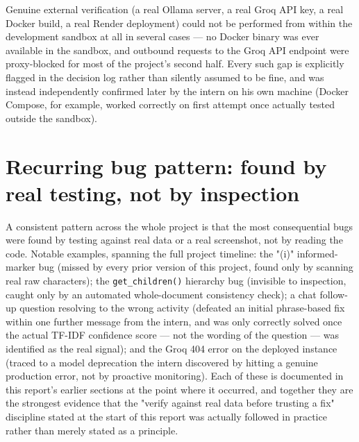 Genuine external verification (a real Ollama server, a real Groq API key, a real Docker build, a real Render deployment) could not be performed from within the development sandbox at all in several cases — no Docker binary was ever available in the sandbox, and outbound requests to the Groq API endpoint were proxy-blocked for most of the project's second half. Every such gap is explicitly flagged in the decision log rather than silently assumed to be fine, and was instead independently confirmed later by the intern on his own machine (Docker Compose, for example, worked correctly on first attempt once actually tested outside the sandbox).

\section{Recurring bug pattern: found by real testing, not by inspection}
A consistent pattern across the whole project is that the most consequential bugs were found by testing against real data or a real screenshot, not by reading the code. Notable examples, spanning the full project timeline: the "(i)" informed-marker bug (missed by every prior version of this project, found only by scanning real raw characters); the \texttt{get\_\allowbreak{}children()} hierarchy bug (invisible to inspection, caught only by an automated whole-document consistency check); a chat follow-up question resolving to the wrong activity (defeated an initial phrase-based fix within one further message from the intern, and was only correctly solved once the actual TF-IDF confidence score — not the wording of the question — was identified as the real signal); and the Groq 404 error on the deployed instance (traced to a model deprecation the intern discovered by hitting a genuine production error, not by proactive monitoring). Each of these is documented in this report's earlier sections at the point where it occurred, and together they are the strongest evidence that the "verify against real data before trusting a fix" discipline stated at the start of this report was actually followed in practice rather than merely stated as a principle.

